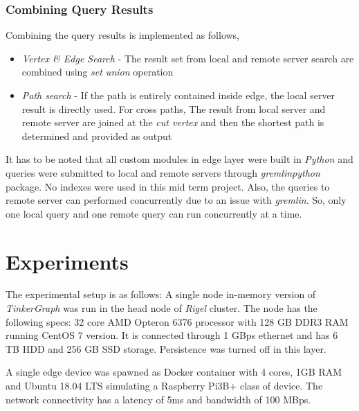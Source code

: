 \documentclass[conference]{IEEEtran}
\begin{document}
\subsubsection{Combining Query Results}
Combining the query results is implemented as follows,
\begin{itemize}
	\item \emph{Vertex \& Edge Search} - The result set from local and remote server search are combined using \emph{set union} operation
	\item \emph{Path search} - If the path is entirely contained inside edge, the local server result is directly used. For cross paths, The result from local server and remote server are joined at the \emph{cut vertex} and then the shortest path is determined and provided as output
\end{itemize}

It has to be noted that all custom modules in edge layer were built in \emph{Python} and queries were submitted to local and remote servers through \emph{gremlinpython} package. No indexes were used in this mid term project. Also, the queries to remote server can performed concurrently due to an issue with \emph{gremlin}. So, only one local query and one remote query can run concurrently at a time.



\section{Experiments}

The experimental setup is as follows: A single node in-memory version of \emph{TinkerGraph} was run in the head node of \emph{Rigel} cluster. The node has the following specs: 32 core AMD Opteron 6376 processor with 128 GB DDR3 RAM running CentOS 7 version. It is connected through 1 GBps ethernet and has 6 TB HDD and 256 GB SSD storage. Persistence was turned off in this layer.

A single edge device was spawned as Docker container with 4 cores, 1GB RAM and Ubuntu 18.04 LTS simulating a Raspberry Pi3B+ class of device. The network connectivity has a latency of 5ms and bandwidth of 100 MBps.
\end{document}
